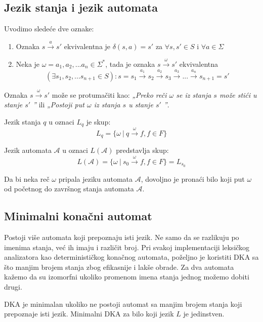 \documentclass[a4paper]{article}
\begin{document}
\vspace{5pt}

\subsection{Jezik stanja i jezik automata}

Uvodimo sledeće dve oznake:
\begin{enumerate}
\item Oznaka  $s \xrightarrow{a} s'$ ekvivalentna je $\delta (s, a) = s'$ za $\forall s, s' \in S$ i $\forall a \in \Sigma$
\item Neka je $\omega = a_{1}, a_{2}, ... a_{n} \in \Sigma^{*}$, tada je oznaka $s \xrightarrow{\omega} s'$ ekvivalentna 
$$(\exists s_{1}, s_{2}, ... s_{n+1} \in S) : s = s_{1} \xrightarrow{a_{1}} s_{2} \xrightarrow{a_{2}} s_{3} \xrightarrow{a_{3}} ... \xrightarrow{a_{n}} s_{n+1} = s'$$
\end{enumerate}
Oznaka $s \xrightarrow{\omega} s'$ može se protumačiti kao: \textit{„Preko reči $\omega$ se iz stanja $s$ može stići u stanje $s'$ ”} ili \textit{„Postoji put $\omega$ iz stanja $s$ u stanje $s'$ ”}.

\vspace{20pt}

Jezik stanja $q$ u oznaci $L_{q}$ je skup:
$$ L_{q} = \{ \omega \ | \ q \xrightarrow{\omega} f, f \in F \}$$

\vspace{5pt}

Jezik automata $\mathcal{A}$ u oznaci $L(\mathcal{A})$ predstavlja skup:
$$ L(\mathcal{A}) = \{ \omega \ | \ s_{0} \xrightarrow{\omega} f, f \in F \} = L_{s_{0}}$$

Da bi neka reč $\omega$ pripala jeziku automata $\mathcal{A}$, dovoljno je pronaći bilo koji put $\omega$ od početnog do završnog stanja automata $\mathcal{A}$. \par


\subsection{Minimalni konačni automat}
Postoji više automata koji prepoznaju isti jezik. Ne samo da se razlikuju po imenima stanja, već ih imaju i različit broj. Pri svakoj implementaciji leksičkog analizatora kao determinističkog konačnog automata, poželjno je koristiti DKA sa što manjim brojem stanja zbog efikasnije i lakše obrade. Za dva automata kažemo da su izomorfni ukoliko promenom imena stanja jednog možemo dobiti drugi. \par
DKA je minimalan ukoliko ne postoji automat sa manjim brojem stanja koji prepoznaje isti jezik. Minimalni DKA za bilo koji jezik $L$ je jedinstven. \par
\end{document}
